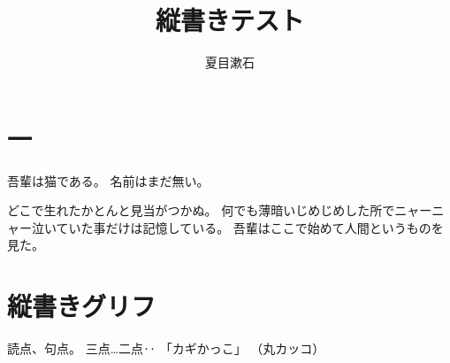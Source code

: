 \documentclass[tate]{jlreq}
\title{縦書きテスト}
\author{夏目漱石}
\begin{document}
\maketitle

\section*{一}

吾輩は猫である。
名前はまだ無い。

どこで生れたかとんと見当がつかぬ。
何でも薄暗いじめじめした所でニャーニャー泣いていた事だけは記憶している。
吾輩はここで始めて人間というものを見た。

\section*{縦書きグリフ}

読点、句点。
三点…二点‥
「カギかっこ」
（丸カッコ）

\end{document}
